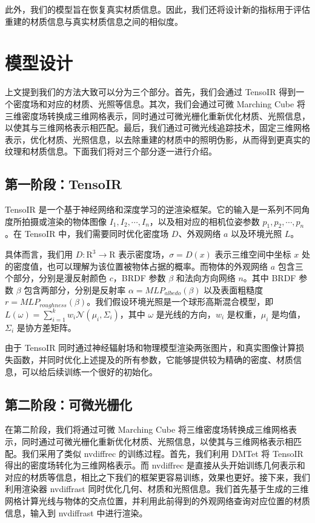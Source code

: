 此外，我们的模型旨在恢复真实材质信息。因此，我们还将设计新的指标用于评估重建的材质信息与真实材质信息之间的相似度。

\section{模型设计}

上文提到我们的方法大致可以分为三个部分。首先，我们会通过 TensoIR\cite{tensoir} 得到一个密度场和对应的材质、光照等信息。其次，我们会通过可微 Marching Cube 将三维密度场转换成三维网格表示，同时通过可微光栅化重新优化材质、光照信息，以使其与三维网格表示相匹配。最后，我们通过可微光线追踪技术，固定三维网格表示，优化材质、光照信息，以去除重建的材质中的照明伪影，从而得到更真实的纹理和材质信息。下面我们将对三个部分逐一进行介绍。

\subsection{第一阶段：TensoIR}

TensoIR 是一个基于神经网络和深度学习的逆渲染框架。它的输入是一系列不同角度所拍摄或渲染的物体图像 $I_1, I_2, \cdots, I_n$，以及相对应的相机位姿参数 $p_1, p_2, \cdots, p_n$。在 TensoIR 中，我们需要同时优化密度场 $D$、外观网络 $a$ 以及环境光照 $L$。

具体而言，我们用 $D: \mathrm{R}^3 \to \mathrm{R}$ 表示密度场，$\sigma=D(x)$ 表示三维空间中坐标 $x$ 处的密度值，也可以理解为该位置被物体占据的概率。而物体的外观网络 $a$ 包含三个部分，分别是漫反射颜色 $c$，BRDF 参数 $\beta$ 和法向方向网络 $n$。其中 BRDF 参数 $\beta$ 包含两部分，分别是反射率 $\alpha = MLP_{albedo}(\beta)$ 以及表面粗糙度 $r=MLP_{roughness}(\beta)$。我们假设环境光照是一个球形高斯混合模型，即 $L(\omega) = \sum_{i=1}^k w_i \mathcal{N}(\mu_i, \Sigma_i)$，其中 $\omega$ 是光线的方向，$w_i$ 是权重，$\mu_i$ 是均值，$\Sigma_i$ 是协方差矩阵。

由于 TensoIR 同时通过神经辐射场和物理模型渲染两张图片，和真实图像计算损失函数，并同时优化上述提及的所有参数，它能够提供较为精确的密度、材质信息，可以给后续训练一个很好的初始化。

\subsection{第二阶段：可微光栅化}

在第二阶段，我们将通过可微 Marching Cube 将三维密度场转换成三维网格表示，同时通过可微光栅化重新优化材质、光照信息，以使其与三维网格表示相匹配。我们采用了类似 nvdiffrec\cite{nvdiffrec} 的训练过程。首先，我们利用 DMTet\cite{DMTet} 将 TensoIR 得出的密度场转化为三维网格表示。而 nvdiffrec 是直接从头开始训练几何表示和对应的材质等信息，相比之下我们的框架更容易训练，效果也更好。接下来，我们利用渲染器 nvdiffrast\cite{nvdiffrast} 同时优化几何、材质和光照信息。我们首先基于生成的三维网格计算光线与物体的交点位置，并利用此前得到的外观网络查询对应位置的材质信息，输入到 nvdiffrast 中进行渲染。

